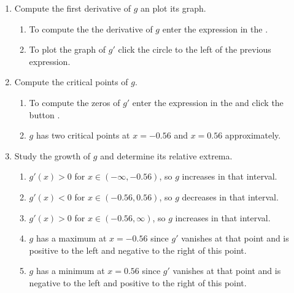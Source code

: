 \begin{enumerate}[leftmargin=*]
\begin{enumerate}
      \item Compute the first derivative of $g$ an plot its graph.
            \begin{indication}
            \begin{enumerate}
            \item To compute the the derivative of $g$ enter the expression  in the .
            \item To plot the graph of $g'$ click the circle to the left of the previous expression.
            \end{enumerate}
            \end{indication}

      \item Compute the critical points of $g$.
            \begin{indication}
            \begin{enumerate}
            \item To compute the zeros of $g'$ enter the expression  in the  and click the button .
            \item $g$ has two critical points at $x=-0.56$ and $x=0.56$ approximately.
            \end{enumerate}
            \end{indication}

      \item Study the growth of $g$ and determine its relative extrema.
            \begin{indication}
            \begin{enumerate}
            \item $g'(x)>0$ for $x\in (-\infty, -0.56)$, so $g$ increases in that interval.
            \item $g'(x)<0$ for $x\in (-0.56, 0.56)$, so $g$ decreases in that interval.
            \item $g'(x)>0$ for $x\in (-0.56, \infty)$, so $g$ increases in that interval.
            \item $g$ has a maximum at $x=-0.56$ since $g'$ vanishes at that point and is positive to the left and negative to the right of this point.
            \item $g$ has a minimum at $x=0.56$ since $g'$ vanishes at that point and is negative to the left and positive to the right of this point.
            \end{enumerate}
            \end{indication}


\end{enumerate}
\end{enumerate}
